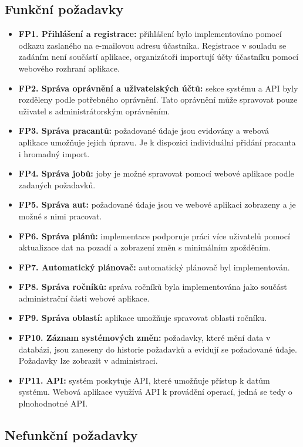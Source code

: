 \subsection{Funkční požadavky}

\begin{itemize}
  \item \textbf{FP1. Přihlášení a registrace:} přihlášení bylo implementováno pomocí odkazu zaslaného na e-mailovou adresu účastníka. Registrace v souladu se zadáním není součástí aplikace, organizátoři importují účty účastníku pomocí webového rozhraní aplikace.
  \item \textbf{FP2. Správa oprávnění a uživatelských účtů:} sekce systému a API byly rozděleny podle potřebného oprávnění. Tato oprávnění může spravovat pouze uživatel s 
  administrátorským oprávněním.
  \item \textbf{FP3. Správa pracantů:} požadované údaje jsou evidovány a webová aplikace umožňuje jejich úpravu. Je k dispozici individuální přidání pracanta i hromadný import.
  \item \textbf{FP4. Správa jobů:} joby je možné spravovat pomocí webové aplikace podle zadaných požadavků.
  \item \textbf{FP5. Správa aut:} požadované údaje jsou ve webové aplikaci zobrazeny a je možné s nimi pracovat.
  \item \textbf{FP6. Správa plánů:} implementace podporuje práci více uživatelů pomocí aktualizace dat na pozadí a zobrazení změn s minimálním zpožděním. 
  \item \textbf{FP7. Automatický plánovač:} automatický plánovač byl implementován.
  \item \textbf{FP8. Správa ročníků:} správa ročníků byla implementována jako součást administrační části webové aplikace.
  \item \textbf{FP9. Správa oblastí:} aplikace umožňuje spravovat oblasti ročníku.
  \item \textbf{FP10. Záznam systémových změn:} požadavky, které mění data v databázi, jsou zaneseny do historie požadavků a evidují se požadované údaje. Požadavky
  lze zobrazit v administraci.
  \item \textbf{FP11. API:} systém poskytuje API, které umožňuje přístup k datům systému. Webová aplikace využívá API k provádění operací, jedná se tedy o plnohodnotné API.
\end{itemize}

\subsection{Nefunkční požadavky}

